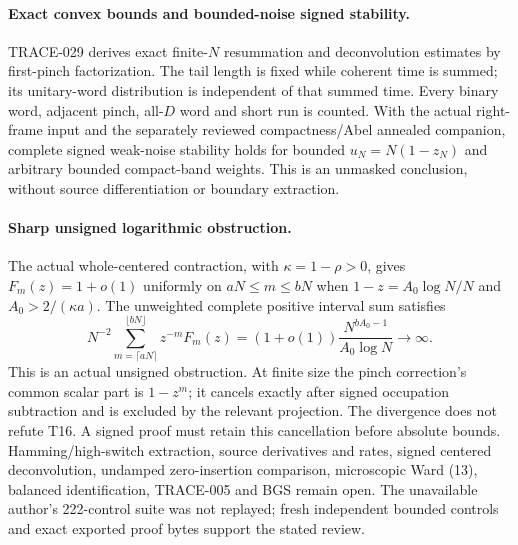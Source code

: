 \paragraph{Exact convex bounds and bounded-noise signed stability.}
TRACE-029 derives exact finite-$N$ resummation and deconvolution estimates by
first-pinch factorization. The tail length is fixed while coherent time is
summed; its unitary-word distribution is independent of that summed time.
Every binary word, adjacent pinch, all-$D$ word and short run is counted.
With the actual right-frame input and the separately reviewed compactness/Abel
annealed companion, complete signed weak-noise stability holds for bounded
$u_N=N(1-z_N)$ and arbitrary bounded compact-band weights. This is an
unmasked conclusion, without source differentiation or boundary extraction.

\paragraph{Sharp unsigned logarithmic obstruction.}
The actual whole-centered contraction, with $\kappa=1-\rho>0$, gives
$F_m(z)=1+o(1)$ uniformly on $aN\le m\le bN$ when
$1-z=A_0\log N/N$ and $A_0>2/(\kappa a)$. The unweighted complete positive
interval sum satisfies
\[
 N^{-2}\sum_{m=\lceil aN\rceil}^{\lfloor bN\rfloor}
 z^{-m}F_m(z)
 =(1+o(1))\frac{N^{bA_0-1}}{A_0\log N}\longrightarrow\infty.
\]
This is an actual unsigned obstruction. At finite size the pinch correction's
common scalar part is $1-z^m$; it cancels exactly after signed occupation
subtraction and is excluded by the relevant projection. The divergence does
not refute T16. A signed proof must retain this cancellation before absolute
bounds. Hamming/high-switch extraction, source derivatives and rates, signed
centered deconvolution, undamped zero-insertion comparison, microscopic
Ward (13), balanced identification, TRACE-005 and BGS remain open.
The unavailable author's 222-control suite was not replayed; fresh independent
bounded controls and exact exported proof bytes support the stated review.

